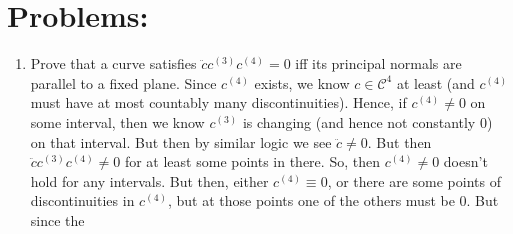 \documentclass[12pt]{amsart}
\newcommand{\q}[1]{\item #1}
\begin{document}
\section{Problems:}
\begin{enumerate}
\q{Prove that a curve satisfies $\ddot cc^{(3)}c^{(4)}=0$ iff its principal normals are parallel to a fixed plane.}
Since $c^{(4)}$ exists, we know $c\in\mathcal{C}^4$ at least (and $c^{(4)}$ must have at most countably many discontinuities). Hence, if $c^{(4)}\neq0$ on some interval, then we know $c^{(3)}$ is changing (and hence not constantly 0) on that interval. But then by similar logic we see $\ddot c\neq0$. But then $\ddot cc^{(3)}c^{(4)}\neq0$ for at least some points in there. So, then $c^{(4)}\neq0$ doesn't hold for any intervals. But then, either $c^{(4)}\equiv0$, or there are some points of discontinuities in $c^{(4)}$, but at those points one of the others must be 0. But since the 


\end{enumerate}
\end{document}
